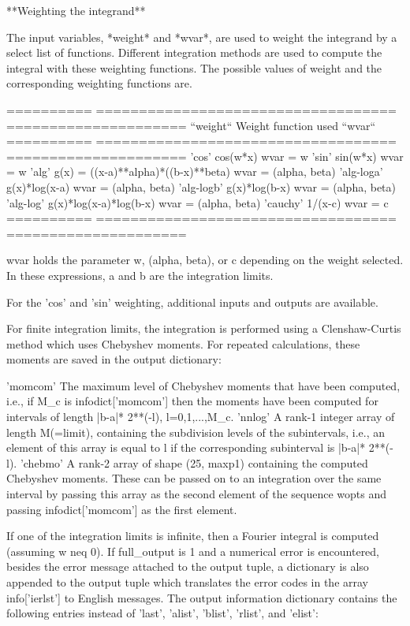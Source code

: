 \begin{DoxyVerb}
**Weighting the integrand**

The input variables, *weight* and *wvar*, are used to weight the
integrand by a select list of functions.  Different integration
methods are used to compute the integral with these weighting
functions.  The possible values of weight and the corresponding
weighting functions are.

==========  ===================================   =====================
``weight``  Weight function used                  ``wvar``
==========  ===================================   =====================
'cos'       cos(w*x)                              wvar = w
'sin'       sin(w*x)                              wvar = w
'alg'       g(x) = ((x-a)**alpha)*((b-x)**beta)   wvar = (alpha, beta)
'alg-loga'  g(x)*log(x-a)                         wvar = (alpha, beta)
'alg-logb'  g(x)*log(b-x)                         wvar = (alpha, beta)
'alg-log'   g(x)*log(x-a)*log(b-x)                wvar = (alpha, beta)
'cauchy'    1/(x-c)                               wvar = c
==========  ===================================   =====================

wvar holds the parameter w, (alpha, beta), or c depending on the weight
selected.  In these expressions, a and b are the integration limits.

For the 'cos' and 'sin' weighting, additional inputs and outputs are
available.

For finite integration limits, the integration is performed using a
Clenshaw-Curtis method which uses Chebyshev moments.  For repeated
calculations, these moments are saved in the output dictionary:

'momcom'
    The maximum level of Chebyshev moments that have been computed,
    i.e., if M_c is infodict['momcom'] then the moments have been
    computed for intervals of length |b-a|* 2**(-l), l=0,1,...,M_c.
'nnlog'
    A rank-1 integer array of length M(=limit), containing the
    subdivision levels of the subintervals, i.e., an element of this
    array is equal to l if the corresponding subinterval is
    |b-a|* 2**(-l).
'chebmo'
    A rank-2 array of shape (25, maxp1) containing the computed
    Chebyshev moments.  These can be passed on to an integration
    over the same interval by passing this array as the second
    element of the sequence wopts and passing infodict['momcom'] as
    the first element.

If one of the integration limits is infinite, then a Fourier integral is
computed (assuming w neq 0).  If full_output is 1 and a numerical error
is encountered, besides the error message attached to the output tuple,
a dictionary is also appended to the output tuple which translates the
error codes in the array info['ierlst'] to English messages.  The output
information dictionary contains the following entries instead of 'last',
'alist', 'blist', 'rlist', and 'elist':


\end{DoxyVerb}
